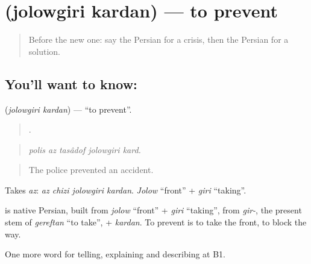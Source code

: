 \section[\texorpdfstring{\fa{جلوگیری} \fa{کردن} (jolowgiri kardan)}{جلوگیری کردن (jolowgiri kardan)}]{  (jolowgiri kardan) — to prevent}

\label{lesson:FA-C377-jelogiri-kardan}



\begin{quote}
Before the new one: say the Persian for a crisis, then the Persian for a solution.
\end{quote}

\subsection*{You'll want to know:  }
\textbf{ } (\emph{jolowgiri kardan}) — \textquotedblleft{}to prevent\textquotedblright{}.

\begin{quote}
    .
\end{quote}

\begin{quote}
\emph{polis az tasâdof jolowgiri kard.}
\end{quote}

\begin{quote}
The police prevented an accident.
\end{quote}

Takes \emph{az}: \emph{az chizi jolowgiri kardan}. \emph{Jolow} \textquotedblleft{}front\textquotedblright{} + \emph{giri} \textquotedblleft{}taking\textquotedblright{}.

\begin{cousinweb}
\textbf{ } is native Persian, built from \emph{jolow} \textquotedblleft{}front\textquotedblright{} + \emph{giri} \textquotedblleft{}taking\textquotedblright{}, from \emph{gir-}, the present stem of \emph{gereftan} \textquotedblleft{}to take\textquotedblright{}, + \emph{kardan}. To prevent is to take the front, to block the way.
\end{cousinweb}

\begin{grammarlens}[title={What you've built}]
One more word for telling, explaining and describing at B1.
\end{grammarlens}

